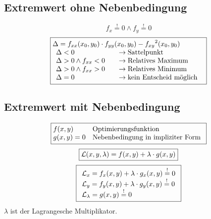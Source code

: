\subsection{Extremwert ohne Nebenbedingung}
\[ \boxed{f_x \stackrel{!}{=} 0 \land f_y \stackrel{!}{=} 0} \]
\[ \boxed{\begin{array}{@{}l}
\Delta = f_{xx}(x_0, y_0) \cdot f_{yy}(x_0, y_0) - {f_{xy}}^2(x_0, y_0) \\
\begin{array}{ll}
\Delta < 0 \quad                    & \rightarrow \text{Sattelpunkt} \\
\Delta > 0 \land f_{xx} < 0 \quad   & \rightarrow \text{Relatives Maximum} \\
\Delta > 0 \land f_{xx} > 0 \quad   & \rightarrow \text{Relatives Minimum} \\
\Delta = 0                  \quad   & \rightarrow \text{kein Entscheid möglich}
\end{array}\end{array}} \]

\subsection{Extremwert mit Nebenbedingung}
\[ \boxed{\begin{array}{@{}ll}
f(x,y) & \text{Optimierungsfunktion} \\
g(x,y) = 0 & \text{Nebenbedingung in impliziter Form} \\
\end{array}} \]
\[ \boxed{\mathcal{L}(x,y,\lambda) = f(x,y) + \lambda \cdot g(x,y)} \]
\[ \boxed{\begin{array}{l}
\mathcal{L}_x = f_x(x,y) + \lambda \cdot g_x(x,y) \stackrel{!}{=} 0 \\
\mathcal{L}_y = f_y(x,y) + \lambda \cdot g_y(x,y) \stackrel{!}{=} 0 \\
\mathcal{L}_\lambda = g(x,y) \stackrel{!}{=} 0 \\
\end{array}} \]
$\lambda$ ist der Lagrangesche Multiplikator. 

